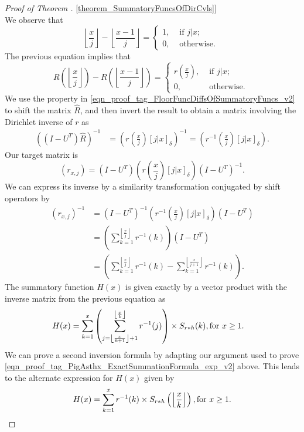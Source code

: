 \documentclass[11pt,reqno,a4letter]{article}
\newcommand{\hlocalref}[1]{\hyperref[#1]{\ref{#1}}}
\numberwithin{equation}{section}
\numberwithin{figure}{section}
\numberwithin{table}{section}
\newcommand{\Iverson}[1]{\ensuremath{\left[#1\right]_{\delta}}}
\newcommand{\floor}[1]{\left\lfloor #1 \right\rfloor}
\newcommand{\Floor}[2]{\ensuremath{\left\lfloor \frac{#1}{#2} \right\rfloor}}
\theoremstyle{plain}
\numberwithin{theorem}{section}
\theoremstyle{definition}
\theoremstyle{remark}
\newcommand{\mathtext}[1]{\text{\rm #1}}
\begin{document}
\begin{proof}[Proof of Theorem \hlocalref{theorem_SummatoryFuncsOfDirCvls}]
\[\]
We observe that 
\[
\Floor{x}{j} - \Floor{x-1}{j} = \begin{cases} 
     1, & \text{ if $j|x$; } \\ 
     0, & \text{ otherwise. } 
     \end{cases} 
\] 
The previous equation implies that 
\begin{equation} 
\label{eqn_proof_tag_FloorFuncDiffsOfSummatoryFuncs_v2} 
R\left(\floor{\frac{x}{j}}\right) - R\left(\floor{\frac{x-1}{j}}\right) = 
     \begin{cases} 
     r\left(\frac{x}{j}\right), & \text{ if $j|x$; } \\ 
     0, & \text{ otherwise. } 
     \end{cases}
\end{equation} 
We use the property in \eqref{eqn_proof_tag_FloorFuncDiffsOfSummatoryFuncs_v2} 
to shift the matrix $\hat{R}$, and then invert the result to obtain a matrix involving the 
Dirichlet inverse of $r$ as 
\begin{align*} 
\left(\left(I-U^{T}\right) \hat{R}\right)^{-1} & = 
     \left(r\left(\frac{x}{j}\right) \Iverson{j|x}\right)^{-1} = 
     \left(r^{-1}\left(\frac{x}{j}\right) \Iverson{j|x}\right). 
\end{align*} 
Our target matrix is 
$$(r_{x,j}) = \left(I-U^{T}\right) \left(r\left(\frac{x}{j}\right) \Iverson{j|x}\right) \left(I-U^{T}\right)^{-1}.$$
We can express its inverse by a similarity transformation conjugated by shift operators by 
\begin{align*} 
(r_{x,j})^{-1} & = \left(I-U^{T}\right)^{-1} \left(r^{-1}\left(\frac{x}{j}\right) 
     \Iverson{j|x}\right) \left(I-U^{T}\right) \\ 
     & = \left(\sum_{k=1}^{\floor{\frac{x}{j}}} r^{-1}(k)\right) \left(I-U^{T}\right) \\ 
     & = \left(\sum_{k=1}^{\floor{\frac{x}{j}}} r^{-1}(k) - \sum_{k=1}^{\floor{\frac{x}{j+1}}} r^{-1}(k)\right). 
\end{align*} 
The summatory function $H(x)$ is given exactly 
by a vector product with the inverse matrix from the previous equation as 
\begin{align*} 
H(x) & = \sum_{k=1}^x \left(\sum_{j=\floor{\frac{x}{k+1}}+1}^{\floor{\frac{x}{k}}} r^{-1}(j)\right) 
	\times S_{r \ast h}(k), \mathtext{ for } x \geq 1. 
\end{align*} 
We can prove a second inversion formula by adapting our argument used to prove 
\eqref{eqn_proof_tag_PigAsthx_ExactSummationFormula_exp_v2} above. 
This leads to the alternate expression for $H(x)$ given by 
\[
H(x) = \sum_{k=1}^{x} r^{-1}(k) \times S_{r \ast h}\left(\Floor{x}{k}\right), 
     \mathtext{ for } x \geq 1. 
     \qedhere 
\]
\end{proof} 
\end{document}
